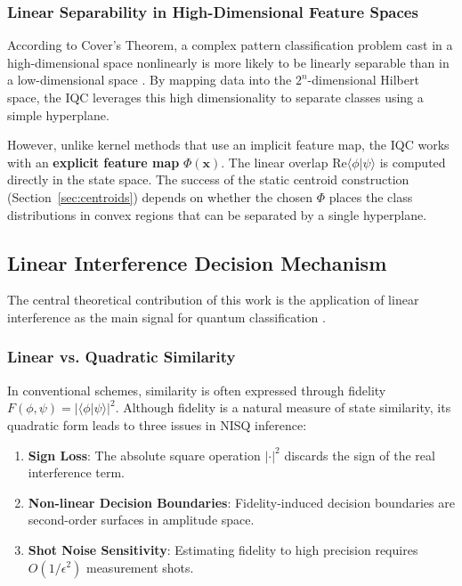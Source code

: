 \documentclass[conference]{IEEEtran}
\begin{document}
\subsubsection{Linear Separability in High-Dimensional Feature Spaces}
According to Cover's Theorem, a complex pattern classification problem cast in a high-dimensional space nonlinearly is more likely to be linearly separable than in a low-dimensional space \cite{cover1965geometrical}. By mapping data into the $2^n$-dimensional Hilbert space, the IQC leverages this high dimensionality to separate classes using a simple hyperplane.

However, unlike kernel methods that use an implicit feature map, the IQC works with an \textbf{explicit feature map} $\Phi(\mathbf{x})$. The linear overlap $\mathrm{Re}\langle \phi | \psi \rangle$ is computed directly in the state space. The success of the static centroid construction (Section~\ref{sec:centroids}) depends on whether the chosen $\Phi$ places the class distributions in convex regions that can be separated by a single hyperplane.

\subsection{Linear Interference Decision Mechanism}
The central theoretical contribution of this work is the application of linear interference as the main signal for quantum classification \cite{schuld2017distance,schuld2018book}.

\subsubsection{Linear vs. Quadratic Similarity}
In conventional schemes, similarity is often expressed through fidelity $F(\phi, \psi) = |\langle \phi | \psi \rangle|^2$. Although fidelity is a natural measure of state similarity, its quadratic form leads to three issues in NISQ inference:
\begin{enumerate}
    \item \textbf{Sign Loss}: The absolute square operation $|\cdot|^2$ discards the sign of the real interference term.
    \item \textbf{Non-linear Decision Boundaries}: Fidelity-induced decision boundaries are second-order surfaces in amplitude space.
    \item \textbf{Shot Noise Sensitivity}: Estimating fidelity to high precision requires $O(1/\epsilon^2)$ measurement shots.
\end{enumerate}
\end{document}
